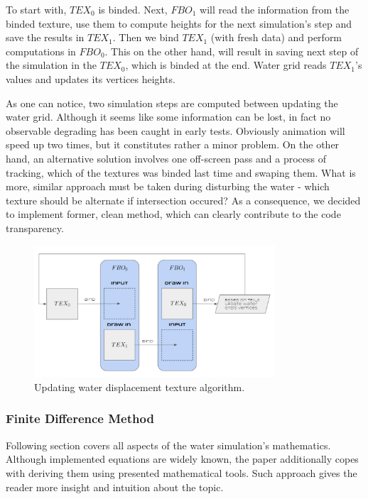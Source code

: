 \documentclass{report}
\begin{document}
To start with, $TEX_0$ is binded. Next, $FBO_1$ will read the information from the binded texture, use them to compute heights for the next simulation's step and save the results in $TEX_1$. Then we bind $TEX_1$ (with fresh data) and perform computations in $FBO_0$. This on the other hand, will result in saving next step of the simulation in the $TEX_0$, which is binded at the end. Water grid reads $TEX_1$'s values and updates its vertices heights.

As one can notice, two simulation steps are computed between updating the water grid. Although it seems like some information can be lost, in fact no observable degrading has been caught in early tests. Obviously animation will speed up two times, but it constitutes rather a minor problem. On the other hand, an alternative solution involves one off-screen pass and a process of tracking, which of the textures was binded last time and swaping them. What is more, similar approach must be taken during disturbing the water - which texture should be alternate if intersection occured? As a consequence, we decided to implement former, clean method, which can clearly contribute to the code transparency.



\begin{figure}[H]
    \centering
    \includegraphics[width=0.8\textwidth]{images/fbo_tex.pdf}
    \caption{Updating water displacement texture algorithm. }
    \label{fig:fbo_algo}
\end{figure}


\subsubsection{Finite Difference Method}
Following section covers all aspects of the water simulation's mathematics. Although implemented equations are widely known, the paper additionally copes with deriving them using presented mathematical tools. Such approach gives the reader more insight and intuition about the topic. 
\end{document}

